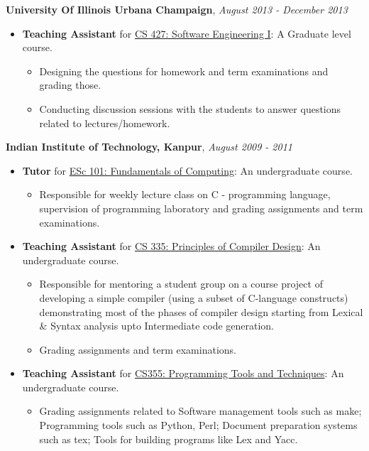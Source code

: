 \documentclass[9pt]{article}
\newenvironment{changemargin}[2]{%
  \begin{list}{}{%
    \setlength{\topsep}{0pt}%
    \setlength{\leftmargin}{#1}%
    \setlength{\rightmargin}{#2}%
    \setlength{\listparindent}{\parindent}%
    \setlength{\itemindent}{\parindent}%
    \setlength{\parsep}{\parskip}%
  }%
  \item[]}{\end{list}
}
\newenvironment{body} {
	\vspace*{-16pt}
	\begin{changemargin}{-0.25in}{-0.5in}
  }	
	{\end{changemargin}
}
\begin{document}
\begin{body}
	\vspace{14pt}
	\textbf{University Of Illinois Urbana Champaign},  \hfill \emph{August 2013 - December 2013}\\
	\vspace*{-4pt}
	\begin{itemize} \itemsep -0pt  %
		\item \textbf{Teaching Assistant} for \href{http://cs.illinois.edu/courses/profile/CS427-120138}{CS 427: Software Engineering I}: A Graduate level course.
			\begin{itemize}
				\item Designing the questions for homework and term examinations and grading those.
				\item Conducting discussion sessions with the students to answer questions related to lectures/homework.   
			\end{itemize}
	\end{itemize}

	\textbf{Indian Institute of Technology, Kanpur},  \hfill \emph{August 2009 - 2011}\\
	\vspace*{-4pt}
	\begin{itemize} \itemsep -0pt  %
		\item \textbf{Tutor} for \href{http://www.cse.iitk.ac.in/teaching/courses/ESc101.html}{ESc 101: Fundamentals of Computing}: An undergraduate course.
			\begin{itemize}
				\item Responsible for weekly lecture class on C - programming language, supervision of programming laboratory and grading assignments and term examinations.
			\end{itemize}
		\item \textbf{Teaching Assistant} for \href{http://www.cse.iitk.ac.in/teaching/courses/CS335.html}{CS 335: Principles of Compiler Design}: An undergraduate course.
			\begin{itemize}
				\item Responsible for mentoring a student group on a course project of developing a simple compiler (using a subset of C-language constructs) demonstrating most of the phases of compiler design starting from Lexical \& Syntax analysis upto Intermediate code generation.
				\item Grading assignments and term examinations.
			\end{itemize}
		\item \textbf{Teaching Assistant} for \href{http://www.cse.iitk.ac.in/teaching/courses/CS355.html}{CS355: Programming Tools and Techniques}: An undergraduate course.
			\begin{itemize}
				\item Grading assignments related to Software management tools such as make; Programming tools such as Python, Perl; Document preparation systems such as tex; Tools for building programs like Lex and Yacc.
			\end{itemize}
	\end{itemize}
\end{body}
\end{document}
